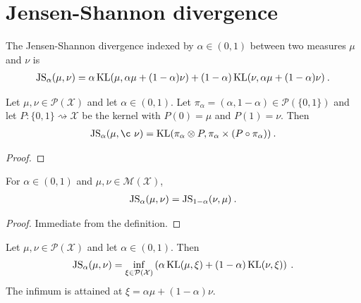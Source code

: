 \section{Jensen-Shannon divergence}

\begin{definition}
  \label{def:jensenShannon}
  The Jensen-Shannon divergence indexed by $\alpha \in (0,1)$ between two measures $\mu$ and $\nu$ is
  \begin{align*}
    \operatorname{JS}_\alpha(\mu, \nu) = \alpha \operatorname{KL}(\mu, \alpha \mu + (1 - \alpha)\nu) + (1 - \alpha) \operatorname{KL}(\nu, \alpha \mu + (1 - \alpha)\nu) \: .
  \end{align*}
\end{definition}


\begin{lemma}
  \label{lem:jensenShannon_eq_kl}
  Let $\mu, \nu \in \mathcal P(\mathcal X)$ and let $\alpha \in (0, 1)$. Let $\pi_\alpha = (\alpha, 1 - \alpha) \in \mathcal P(\{0,1\})$ and let $P : \{0,1\} \rightsquigarrow \mathcal X$ be the kernel with $P(0) = \mu$ and $P(1) = \nu$. Then
  \begin{align*}
  \JS_\alpha(\mu, ¸\nu) = \KL(\pi_\alpha \otimes P, \pi_\alpha \times (P \circ \pi_\alpha)) \: .
  \end{align*}
\end{lemma}

\begin{proof}%
\uses{}

\end{proof}


\begin{lemma}
  \label{lem:jensenShannon_symm}
  For $\alpha \in (0,1)$ and $\mu, \nu \in \mathcal M(\mathcal X)$,
  \begin{align*}
  \operatorname{JS}_\alpha(\mu, \nu) = \operatorname{JS}_{1 - \alpha}(\nu, \mu) \: .
  \end{align*}
\end{lemma}

\begin{proof}%
\uses{}
Immediate from the definition.
\end{proof}


\begin{lemma}
  \label{lem:jensenShannon_eq_inf_add_kl}
  Let $\mu, \nu \in \mathcal P(\mathcal X)$ and let $\alpha \in (0, 1)$. Then
  \begin{align*}
  \operatorname{JS}_\alpha(\mu, \nu) = \inf_{\xi \in \mathcal P(\mathcal X)}\left( \alpha \operatorname{KL}(\mu, \xi) + (1 - \alpha)\operatorname{KL}(\nu, \xi) \right) \: .
  \end{align*}
  The infimum is attained at $\xi = \alpha \mu + (1 - \alpha) \nu$.
\end{lemma}

